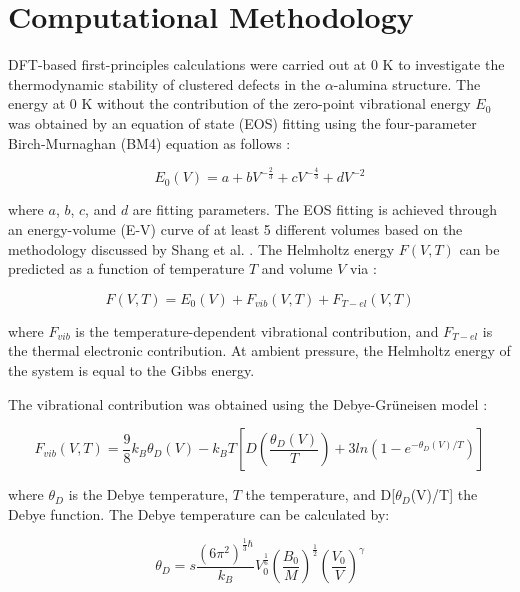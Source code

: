 \section{Computational Methodology}

DFT-based first-principles calculations were carried out at 0 K to investigate the thermodynamic stability of clustered defects in the $\alpha$-alumina structure. The energy at 0 K without the contribution of the zero-point vibrational energy $E_{0}$ was obtained by an equation of state (EOS) fitting using the four-parameter Birch-Murnaghan (BM4) equation as follows \cite{Shang2010}:

\begin{equation}
\label{Ch3-eq: EOS}
E_{0}(V) = a + bV^{- \frac{2}{3}} + cV^{- \frac{4}{3}} + dV^{-2}
\end{equation}

\noindent where $a$, $b$, $c$, and $d$ are fitting parameters. The EOS fitting is achieved through an energy-volume (E-V) curve of at least 5 different volumes based on the methodology discussed by Shang et al. \cite{Shang2010}. The Helmholtz energy $F(V,T)$ can be predicted as a function of temperature $T$ and volume $V$ via \cite{Shang2010,Wang2004}:

\begin{equation}
\label{Ch3-eq: helmholtz}
F(V,T) = E_{0}(V) + F_{vib}(V,T) + F_{T-el}(V,T)
\end{equation}

\noindent where $F_{vib}$ is the temperature-dependent vibrational contribution, and $F_{T-el}$ is the thermal electronic contribution. At ambient pressure, the Helmholtz energy of the system is equal to the Gibbs energy. 

The vibrational contribution was obtained using the Debye-Gr\"uneisen model \cite{Shang2010}:

\begin{equation}
\label{Ch3-eq: Fvib}
F_{vib}(V,T) = \frac{9}{8} k_{B} \theta_{D}(V) - k_{B}T \left [D\left( \frac{\theta_{D} (V)}{T} \right) + 3 ln \left(1-e^{-\theta_{D}(V)/T} \right) \right]
\end{equation}

\noindent where $\theta_{D}$ is the Debye temperature, $T$ the temperature, and D[$\theta_{D}$(V)/T] the Debye function. The Debye temperature can be calculated by: 

\begin{equation}
\label{Ch3-eq: debyetT}
\theta_{D} = s \frac{(6\pi^{2})^{\frac{1}{3} \hbar}}{k_{B}} V_{0}^{\frac{1}{6}} \left(\frac{B_{0}}{M} \right)^{\frac{1}{2}} \left(\frac{V_{0}}{V} \right)^{\gamma}
\end{equation}

